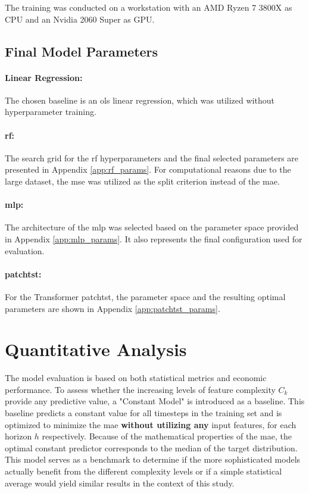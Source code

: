 \documentclass[12pt,twoside=false,a4paper,parskip]{scrbook}
\begin{document}
The training was conducted on a workstation with an AMD Ryzen 7 3800X as CPU and an Nvidia 2060 Super as GPU.



\subsection{Final Model Parameters}

\paragraph{Linear Regression:}
The chosen baseline is an \gls{ols} linear regression, which was utilized without hyperparameter training.

\paragraph{\gls{rf}:}
The search grid for the \gls{rf} hyperparameters and the final selected parameters are presented in Appendix \ref{app:rf_params}. For computational reasons due to the large dataset, the \gls{mse} was utilized as the split criterion instead of the \gls{mae}.

\paragraph{\gls{mlp}:}
The architecture of the \gls{mlp} was selected based on the parameter space provided in Appendix \ref{app:mlp_params}. It also represents the final configuration used for evaluation.

\paragraph{\gls{patchtst}:}
For the Transformer \gls{patchtst}, the parameter space and the resulting optimal parameters are shown in Appendix \ref{app:patchtst_params}.





\section{Quantitative Analysis}
The model evaluation is based on both statistical metrics and economic performance. To assess whether the increasing levels of feature complexity $C_k$ provide any predictive value, a "Constant Model" is introduced as a baseline.
This baseline predicts a constant value for all timesteps in the training set and is optimized to minimize the \gls{mae} \textbf{without utilizing any} input features, for each horizon $h$ respectively.
Because of the mathematical properties of the \gls{mae}, the optimal constant predictor corresponds to the median of the target distribution. This model serves as a benchmark to determine if the more sophisticated models actually benefit from the different complexity levels or if a simple statistical average would yield similar results in the context of this study.
\end{document}
